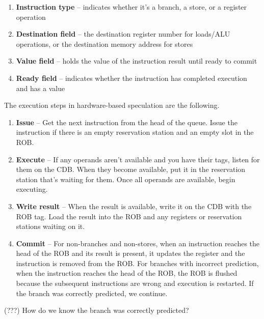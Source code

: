 \documentclass{article}
\begin{document}
\begin{enumerate}
\item \textbf{Instruction type} -- indicates whether it's a branch, a store, or a register operation

\item \textbf{Destination field} -- the destination register number for loads/ALU operations, or the destination memory address for stores

\item \textbf{Value field} -- holds the value of the instruction result until ready to commit 

\item \textbf{Ready field} -- indicates whether the instruction has completed execution and has a value
\end{enumerate}



The execution steps in hardware-based speculation are the following.

\begin{enumerate}
\item \textbf{Issue} -- Get the next instruction from the head of the queue. Issue the instruction if there is an empty reservation station and an empty slot in the ROB.

\item \textbf{Execute} -- If any operands aren't available and you have their tags, listen for them on the CDB. When they become available, put it in the reservation station that's waiting for them. Once all operands are available, begin executing.

\item \textbf{Write result} -- When the result is available, write it on the CDB with the ROB tag. Load the result into the ROB and any registers or reservation stations waiting on it. 

\item \textbf{Commit} -- For non-branches and non-stores, when an instruction reaches the head of the ROB and its result is present, it updates the register and the instruction is removed from the ROB. For branches with incorrect prediction, when the instruction reaches the head of the ROB, the ROB is flushed because the subsequent instructions are wrong and execution is restarted. If the branch was correctly predicted, we continue.

\end{enumerate}

(???) How do we know the branch was correctly predicted? 
\end{document}
